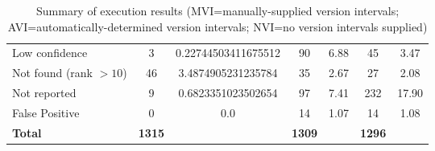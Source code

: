 \begin{table}
\begin{tabular}{ l c c c c c c}
    Low confidence                                    & 3 & 0.22744503411675512 &                90                           &                6.88                       &                45                           &                3.47        \\
    Not found (rank $> 10$)                           & 46 & 3.4874905231235784 &                35                           &                2.67                       &                27                           &                2.08        \\
    Not reported                                      & 9 & 0.6823351023502654 &                97                           &                7.41                       &                232                          &                17.90       \\
    False Positive                                    & 0 & 0.0 &                14                           &                1.07                       &                14                           &                1.08        \\
    \textbf{Total}                     & \textbf{1315} &             & \textbf{1309} &             & \textbf{1296} &
  \end{tabular}
  \caption{Summary of execution results (MVI=manually-supplied version intervals; AVI=automatically-determined version intervals; NVI=no version intervals supplied)}
  \label{tab:tracer_dataset_results}
\end{table}